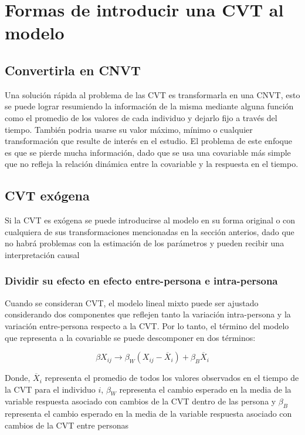 \documentclass[spanish]{article}
\numberwithin{figure}{subsection}
\numberwithin{equation}{subsection}
\numberwithin{table}{subsection}
\begin{document}
\section{Formas de introducir una CVT al modelo}

\subsection{Convertirla en CNVT}

Una solución rápida al problema de las CVT es transformarla en una CNVT, esto
se puede lograr resumiendo la información de la misma mediante alguna función
como el promedio de los valores de cada individuo y dejarlo fijo a través del
tiempo. También podria usarse su valor máximo, mínimo o cualquier
transformación que resulte de interés en el estudio. El problema de este
enfoque es que se pierde mucha información, dado que se usa una covariable más
simple que no refleja la relación dinámica entre la covariable y la respuesta
en el tiempo.

\subsection{CVT exógena}

Si la CVT es exógena se puede introducirse al modelo en su forma original o con
cualquiera de sus transformaciones mencionadas en la sección anterios, dado que
no habrá problemas con la estimación de los parámetros y pueden recibir una
interpretación causal

\subsubsection{Dividir su efecto en efecto entre-persona e intra-persona}

Cuando se consideran CVT, el modelo lineal mixto puede ser ajustado considerando
dos componentes que reflejen tanto la variación intra-persona y la variación
entre-persona respecto a la CVT. Por lo tanto, el término del modelo que
representa a la covariable se puede descomponer en dos términos:

\[
	\beta X_{ij} \rightarrow \beta_W (X_{ij} - \overline{X}_i)
	+ \beta_B \overline{X}_i
\]

Donde, $\overline{X}_i$ representa el promedio de todos los valores observados
en el tiempo de la CVT para el individuo $i$, $\beta_W$ representa el cambio
esperado en la media de la variable respuesta asociado con cambios de la CVT
dentro de las persona y $\beta_B$ representa el cambio esperado en la media de
la variable respuesta asociado con cambios de la CVT entre personas
\end{document}
